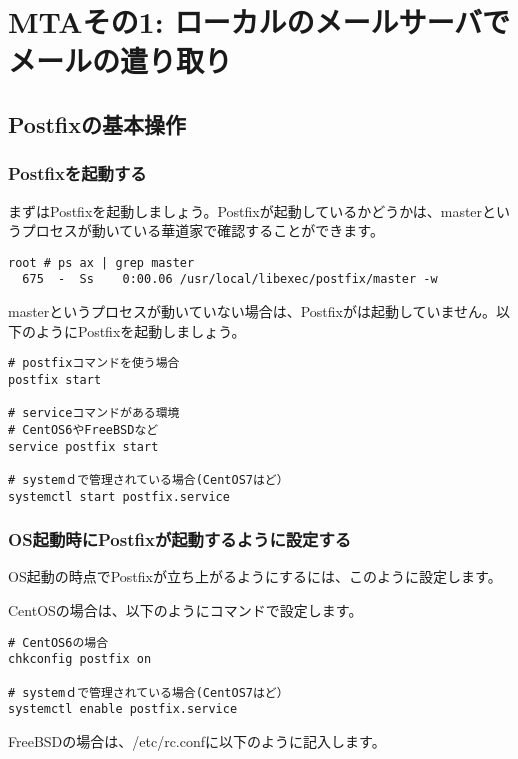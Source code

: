\chapter{MTAその1: ローカルのメールサーバでメールの遣り取り}

\section{Postfixの基本操作}

\subsection{Postfixを起動する}
まずはPostfixを起動しましょう。Postfixが起動しているかどうかは、masterというプロセスが動いている華道家で確認することができます。

\begin{lstlisting}[basicstyle=\ttfamily\footnotesize, frame=single]
root # ps ax | grep master
  675  -  Ss    0:00.06 /usr/local/libexec/postfix/master -w
\end{lstlisting}

masterというプロセスが動いていない場合は、Postfixがは起動していません。以下のようにPostfixを起動しましょう。

\begin{lstlisting}[basicstyle=\ttfamily\footnotesize, frame=single]
# postfixコマンドを使う場合
postfix start

# serviceコマンドがある環境
# CentOS6やFreeBSDなど
service postfix start

# systemｄで管理されている場合(CentOS7はど）
systemctl start postfix.service
\end{lstlisting}

\subsection{OS起動時にPostfixが起動するように設定する}

OS起動の時点でPostfixが立ち上がるようにするには、このように設定します。

CentOSの場合は、以下のようにコマンドで設定します。

\begin{lstlisting}[basicstyle=\ttfamily\footnotesize, frame=single]
# CentOS6の場合
chkconfig postfix on

# systemｄで管理されている場合(CentOS7はど）
systemctl enable postfix.service
\end{lstlisting}

FreeBSDの場合は、/etc/rc.confに以下のように記入します。

